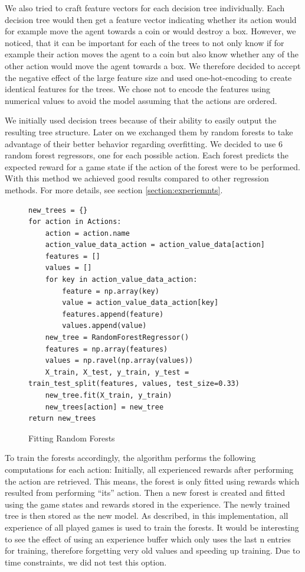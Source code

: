 \documentclass{article}
\begin{document}
We also tried to craft feature vectors for each decision tree individually. Each decision tree would then get a feature vector indicating whether its action would for example move the agent towards a coin or would destroy a box. However, we noticed, that it can be important for each of the trees to not only know if for example their action moves the agent to a coin but also know whether any of the other action would move the agent towards a box. We therefore decided to accept the negative effect of the large feature size and used one-hot-encoding to create identical features for the trees. We chose not to encode the features using numerical values to avoid the model assuming that the actions are ordered.

We initially used decision trees because of their ability to easily output the resulting tree structure. Later on we exchanged them by random forests to take advantage of their better behavior regarding overfitting. We decided to use 6 random forest regressors, one for each possible action. Each forest predicts the expected reward for a game state if the action of the forest were to be performed. With this method we achieved good results compared to other regression methods. For more details, see section \ref{section:experiemnts}.

\begin{figure}
\centering
\begin{verbatim}
new_trees = {}
for action in Actions:
    action = action.name
    action_value_data_action = action_value_data[action]
    features = []
    values = []
    for key in action_value_data_action:
        feature = np.array(key)
        value = action_value_data_action[key]
        features.append(feature)
        values.append(value)
    new_tree = RandomForestRegressor()
    features = np.array(features)
    values = np.ravel(np.array(values))
    X_train, X_test, y_train, y_test = train_test_split(features, values, test_size=0.33)
    new_tree.fit(X_train, y_train)
    new_trees[action] = new_tree
return new_trees
\end{verbatim}
\caption{Fitting Random Forests}
\label{code:random_forest}
\end{figure}

To train the forests accordingly, the algorithm performs the following computations for each action: Initially, all experienced rewards after performing the action are retrieved. This means, the forest is only fitted using rewards which resulted from performing “its” action. Then a new forest is created and fitted using the game states and rewards stored in the experience. The newly trained tree is then stored as the new model. As described, in this implementation, all experience of all played games is used to train the forests. It would be interesting to see the effect of using an experience buffer which only uses the last n entries for training, therefore forgetting very old values and speeding up training. Due to time constraints, we did not test this option.
\end{document}
